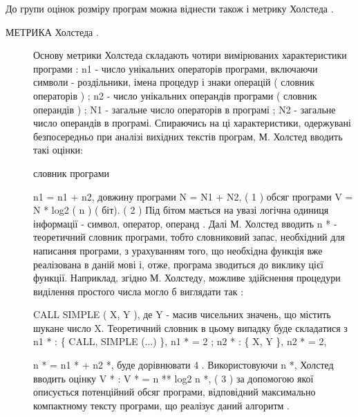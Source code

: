 До групи оцінок розміру програм можна віднести також і метрику Холстеда .
\begin{description}
\item[{МЕТРИКА Холстеда .}] \leavevmode
Основу метрики Холстеда складають чотири вимірюваних характеристики програми :
n1 - число унікальних операторів програми, включаючи символи -
роздільники, імена процедур і знаки операцій ( словник операторів ) ;
n2 - число унікальних операндів програми ( словник операндів ) ;
N1 - загальне число операторів в програмі ;
N2 - загальне число операндів в програмі.
Спираючись на ці характеристики, одержувані безпосередньо при аналізі вихідних текстів програм, М. Холстед вводить такі оцінки:

словник програми

n1 = n1 + n2,
довжину програми
N = N1 + N2, ( 1 )
обсяг програми
V = N * log2 ( n ) ( біт). ( 2 )
Під бітом мається на увазі логічна одиниця інформації - символ, оператор, операнд .
Далі М. Холстед вводить n * - теоретичний словник програми, тобто словниковий запас, необхідний для написання програми, з урахуванням того, що необхідна функція вже реалізована в даній мові і, отже, програма зводиться до виклику цієї функції. Наприклад, згідно М. Холстеду, можливе здійснення процедури виділення простого числа могло б виглядати так :

CALL SIMPLE ( X, Y ),
де Y - масив чисельних значень, що містить шукане число X.
Теоретичний словник в цьому випадку буде складатися з
n1 * : \{ CALL, SIMPLE (...) \},
n1 * = 2 ; n2 * : \{ X, Y \},
n2 * = 2,

n * = n1 * + n2 *,
буде дорівнювати 4 .
Використовуючи n *, Холстед вводить оцінку V * :
V * = n ** log2 n *, ( 3 )
за допомогою якої описується потенційний обсяг програми, відповідний максимально компактному тексту програми, що реалізує даний алгоритм .

\end{description}

